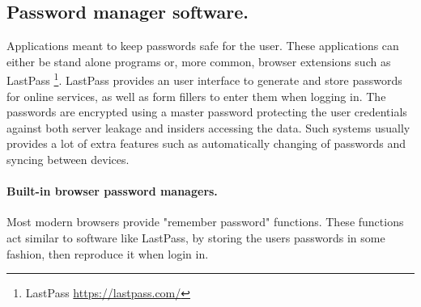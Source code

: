 \subsection{Password manager software.} \label{subsec:pms}
Applications meant to keep passwords safe for the user. These applications can either be stand alone programs or, more common, browser extensions such as LastPass \footnote{LastPass \url{https://lastpass.com/}}. LastPass provides an user interface to generate and store passwords for online services, as well as form fillers to enter them when logging in. The passwords are encrypted using a master password protecting the user credentials against both server leakage and insiders accessing the data. Such systems usually provides a lot of extra features such as automatically changing of passwords and syncing between devices. 

\paragraph{Built-in browser password managers.} Most modern browsers provide "remember password" functions. These functions act similar to software like LastPass, by storing the users passwords in some fashion, then reproduce it when login in. 

